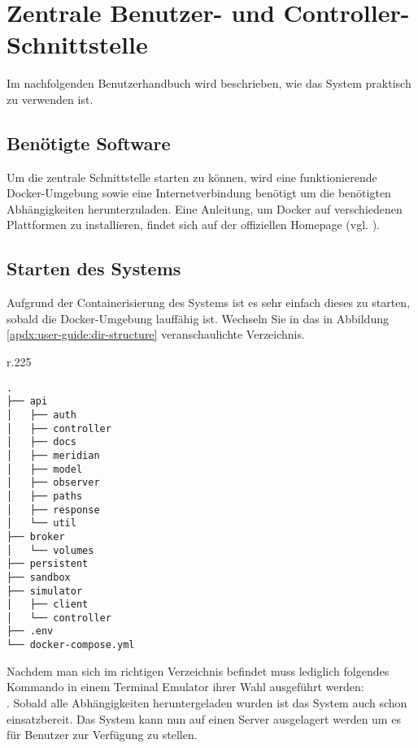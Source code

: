 \section{Zentrale Benutzer- und Controller-Schnittstelle \MjAnnotation{}}\label{sec:apdx:user-guide:mj}
Im nachfolgenden Benutzerhandbuch wird beschrieben, wie das System praktisch zu verwenden ist.

\subsection{Benötigte Software}
Um die zentrale Schnittstelle starten zu können, wird eine funktionierende Docker-Umgebung sowie eine Internetverbindung benötigt um die benötigten Abhängigkeiten herunterzuladen. Eine Anleitung, um Docker auf verschiedenen Plattformen zu installieren, findet sich auf der offiziellen Homepage (vgl. \cite{docker:install}).  

\subsection{Starten des Systems}
Aufgrund der Containerisierung des Systems ist es sehr einfach dieses zu starten, sobald die Docker-Umgebung lauffähig ist. Wechseln Sie in das in Abbildung \ref{apdx:user-guide:dir-structure} veranschaulichte Verzeichnis.
\begin{wrapfigure}[13]{r}{.225\textwidth}
\begin{lstlisting}[style=directoryListing,label={lst:impl:dirstructure:extended}]
.
├── api
│   ├── auth
│   ├── controller
│   ├── docs
│   ├── meridian
│   ├── model
│   ├── observer
│   ├── paths
│   ├── response
│   └── util
├── broker
│   └── volumes
├── persistent
├── sandbox
├── simulator
│   ├── client
│   └── controller
├── .env
└── docker-compose.yml
\end{lstlisting}
\caption{Verzeichnis-Struktur der zentralen Schnittstelle}
\label{apdx:user-guide:dir-structure}
\end{wrapfigure}
Nachdem man sich im richtigen Verzeichnis befindet muss lediglich folgendes Kommando in einem Terminal Emulator ihrer Wahl ausgeführt werden:\\ . Sobald alle Abhängigkeiten heruntergeladen wurden ist das System auch schon einsatzbereit. Das System kann nun auf einen Server ausgelagert werden um es für Benutzer zur Verfügung zu stellen.

